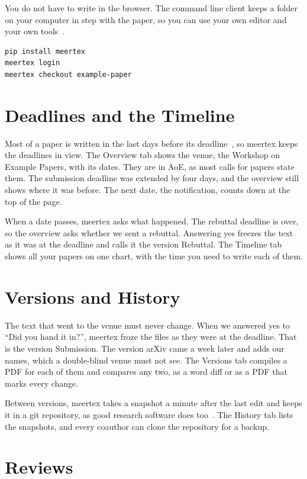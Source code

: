 \documentclass[11pt]{article}
\begin{document}
You do not have to write in the browser. The command line client keeps a
folder on your computer in step with the paper, so you can use your own editor
and your own tools~\cite{kleppmann2019local}.

\begin{verbatim}
pip install meertex
meertex login
meertex checkout example-paper
\end{verbatim}

\section{Deadlines and the Timeline}\label{sec:dates}

Most of a paper is written in the last days before its
deadline~\cite{hartmann2023deadline}, so meertex keeps the deadlines in view.
The Overview tab shows the venue, the Workshop on Example Papers, with its
dates. They are in AoE, as most calls for papers state them. The submission
deadline was extended by four days, and the overview still shows where it was
before. The next date, the notification, counts down at the top of the page.

When a date passes, meertex asks what happened. The rebuttal deadline is over,
so the overview asks whether we sent a rebuttal. Answering yes freezes the
text as it was at the deadline and calls it the version Rebuttal. The Timeline
tab shows all your papers on one chart, with the time you need to write each
of them.

\section{Versions and History}\label{sec:versions}

The text that went to the venue must never change. When we answered yes to
``Did you hand it in?'', meertex froze the files as they were at the deadline.
That is the version Submission. The version arXiv came a week later and adds
our names, which a double-blind venue must not see. The Versions tab compiles a
PDF for each of them and compares any two, as a word diff or as a PDF that
marks every change.

Between versions, meertex takes a snapshot a minute after the last edit and
keeps it in a git repository, as good research software does
too~\cite{wilson2014best}. The History tab lists the snapshots, and every
coauthor can clone the repository for a backup.

\section{Reviews}\label{sec:reviews}
\end{document}
